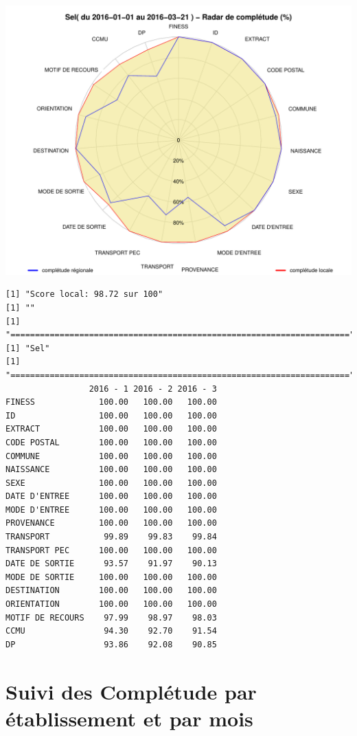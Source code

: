 \documentclass[]{article}
\begin{document}
\includegraphics{completude_files/figure-latex/finess-18.pdf}

\begin{verbatim}
[1] "Score local: 98.72 sur 100"
[1] ""
[1] "====================================================================="
[1] "Sel"
[1] "====================================================================="
                 2016 - 1 2016 - 2 2016 - 3
FINESS             100.00   100.00   100.00
ID                 100.00   100.00   100.00
EXTRACT            100.00   100.00   100.00
CODE POSTAL        100.00   100.00   100.00
COMMUNE            100.00   100.00   100.00
NAISSANCE          100.00   100.00   100.00
SEXE               100.00   100.00   100.00
DATE D'ENTREE      100.00   100.00   100.00
MODE D'ENTREE      100.00   100.00   100.00
PROVENANCE         100.00   100.00   100.00
TRANSPORT           99.89    99.83    99.84
TRANSPORT PEC      100.00   100.00   100.00
DATE DE SORTIE      93.57    91.97    90.13
MODE DE SORTIE     100.00   100.00   100.00
DESTINATION        100.00   100.00   100.00
ORIENTATION        100.00   100.00   100.00
MOTIF DE RECOURS    97.99    98.97    98.03
CCMU                94.30    92.70    91.54
DP                  93.86    92.08    90.85
\end{verbatim}

\section{Suivi des Complétude par établissement et par
mois}\label{suivi-des-completude-par-etablissement-et-par-mois}
\end{document}
